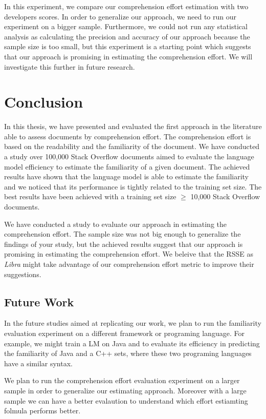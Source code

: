 \documentclass[12pt,mscthesis]{usiinfthesis}
\begin{document}
{In this experiment, we compare our comprehension effort estimation with two developers scores. In order to generalize our approach, we need to run our experiment on a bigger sample. Furthermore, we could not run any statistical analysis as calculating the precision and accuracy of our approach because the sample size is too small, but this experiment is a starting point which suggests that our approach is promising in estimating the comprehension effort. We will investigate this further in future research.




\chapter{Conclusion}

In this thesis, we have presented and evaluated the first approach in the literature able to assess documents by comprehension effort. The comprehension effort is based on the readability and the familiarity of the document. We have conducted a study over 100,000 Stack Overflow documents aimed to evaluate the language model efficiency to estimate the familiarity of a given document. The achieved results have shown that the language model is able to estimate the familiarity and we noticed that its performance is tightly related to the training set size. The best results have been achieved with a training set size $\ge$ 10,000 Stack Overflow documents.

We have conducted a study to evaluate our approach in estimating the comprehension effort. The sample size was not big enough to generalize the findings of your study, but the achieved results suggest that our approach is promising in estimating the comprehension effort. We beleive that the RSSE as \emph{Libra} might take advantage of our comprehension effort metric to improve their suggestions.

\section*{Future Work}

In the future studies aimed at replicating our work, we plan to run the familiarity evaluation experiment on a different framework or programing language. For example, we might train a LM on Java and to evaluate its efficiency in predicting the familiarity of Java and a C++ sets, where these two programing languages have a similar syntax. 


We plan to run the comprehension effort evaluation experiment on a larger sample in order to generalize our estimating approach. Moreover with a large sample we can have a better evalaution to understand which effort estiamting folmula performs better.


}
\end{document}
